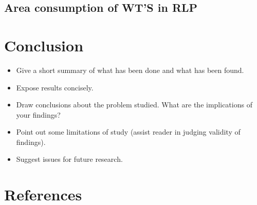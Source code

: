 \documentclass[a4paper,11pt]{article}
\begin{document}
\hypertarget{area-consumption-of-wts-in-rlp}{%
\subsection{Area consumption of WT'S in RLP}\label{area-consumption-of-wts-in-rlp}}

\hypertarget{conclusion}{%
\section{Conclusion}\label{conclusion}}
\begin{itemize}
\item
  Give a short summary of what has been done and what has been found.
\item
  Expose results concisely.
\item
  Draw conclusions about the problem studied. What are the implications of your
  findings?
\item
  Point out some limitations of study (assist reader in judging validity of
  findings).
\item
  Suggest issues for future research.
\end{itemize}
\newpage

\hypertarget{references}{%
\section*{References}\label{references}}

\noindent

\setlength{\parindent}{-0.5cm}
\setlength{\leftskip}{0.5cm}
\setlength{\parskip}{8pt}
\end{document}
